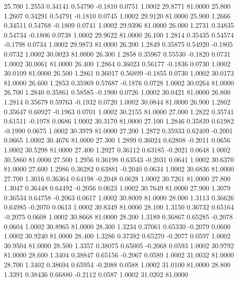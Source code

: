   25.700   1.2553   0.34141   0.54790  -0.1810   0.0751   1.0002  29.8771  81.0000
  25.800   1.2607   0.34291   0.54791  -0.1810   0.0745   1.0002  29.9120  81.0000
  25.900   1.2666   0.34511   0.54768  -0.1809   0.0741   1.0002  29.9396  81.0000
  26.000   1.2731   0.34835   0.54734  -0.1806   0.0738   1.0002  29.9622  81.0000
  26.100   1.2814   0.35435   0.54574  -0.1798   0.0734   1.0002  29.9873  81.0000
  26.200   1.2849   0.35875   0.54920  -0.1805   0.0732   1.0002  30.0023  81.0000
  26.300   1.2858   0.35967   0.55530  -0.1820   0.0731   1.0002  30.0061  81.0000
  26.400   1.2864   0.36023   0.56177  -0.1836   0.0730   1.0002  30.0109  81.0000
  26.500   1.2861   0.36017   0.56899  -0.1855   0.0730   1.0002  30.0173  81.0000
  26.600   1.2853   0.35969   0.57687  -0.1876   0.0728   1.0002  30.0264  81.0000
  26.700   1.2840   0.35861   0.58585  -0.1900   0.0726   1.0002  30.0421  81.0000
  26.800   1.2814   0.35679   0.59763  -0.1932   0.0720   1.0002  30.0844  81.0000
  26.900   1.2802   0.35647   0.60927  -0.1963   0.0701   1.0002  30.2155  81.0000
  27.000   1.2822   0.35741   0.61511  -0.1978   0.0686   1.0002  30.3170  81.0000
  27.100   1.2846   0.35839   0.61982  -0.1990   0.0675   1.0002  30.3979  81.0000
  27.200   1.2872   0.35933   0.62409  -0.2001   0.0665   1.0002  30.4676  81.0000
  27.300   1.2899   0.36024   0.62808  -0.2011   0.0656   1.0002  30.5298  81.0000
  27.400   1.2927   0.36112   0.63185  -0.2021   0.0648   1.0002  30.5860  81.0000
  27.500   1.2956   0.36198   0.63543  -0.2031   0.0641   1.0002  30.6370  81.0000
  27.600   1.2986   0.36282   0.63881  -0.2040   0.0634   1.0002  30.6836  81.0000
  27.700   1.3016   0.36364   0.64198  -0.2048   0.0628   1.0002  30.7261  81.0000
  27.800   1.3047   0.36448   0.64492  -0.2056   0.0623   1.0002  30.7649  81.0000
  27.900   1.3079   0.36534   0.64758  -0.2063   0.0617   1.0002  30.8009  81.0000
  28.000   1.3113   0.36626   0.64985  -0.2070   0.0613   1.0002  30.8349  81.0000
  28.100   1.3150   0.36732   0.65164  -0.2075   0.0608   1.0002  30.8668  81.0000
  28.200   1.3189   0.36867   0.65285  -0.2078   0.0604   1.0002  30.8965  81.0000
  28.300   1.3234   0.37061   0.65330  -0.2079   0.0600   1.0002  30.9240  81.0000
  28.400   1.3286   0.37382   0.65270  -0.2077   0.0597   1.0002  30.9504  81.0000
  28.500   1.3357   0.38075   0.65005  -0.2068   0.0593   1.0002  30.9792  81.0000
  28.600   1.3404   0.38847   0.65156  -0.2067   0.0589   1.0002  31.0032  81.0000
  28.700   1.3402   0.38694   0.65954  -0.2088   0.0588   1.0002  31.0100  81.0000
  28.800   1.3391   0.38436   0.66880  -0.2112   0.0587   1.0002  31.0202  81.0000
